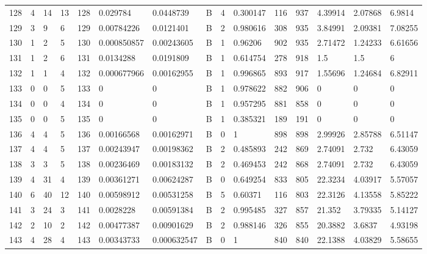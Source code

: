 \begin{latin}
\begin{longtable}{lllllllllllllll}
	128 & 4  & 14  & 13 & 128 & 0.029784       & 0.0448739      & B & 4  & 0.300147 & 116  & 937  & 4.39914 & 2.07868 & 6.9814  \\
	129 & 3  & 9   & 6  & 129 & 0.00784226     & 0.0121401      & B & 2  & 0.980616 & 308  & 935  & 3.84991 & 2.09381 & 7.08255 \\
	130 & 1  & 2   & 5  & 130 & 0.000850857    & 0.00243605     & B & 1  & 0.96206  & 902  & 935  & 2.71472 & 1.24233 & 6.61656 \\
	131 & 1  & 2   & 6  & 131 & 0.0134288      & 0.0191809      & B & 1  & 0.614754 & 278  & 918  & 1.5     & 1.5     & 6       \\
	132 & 1  & 1   & 4  & 132 & 0.000677966    & 0.00162955     & B & 1  & 0.996865 & 893  & 917  & 1.55696 & 1.24684 & 6.82911 \\
	133 & 0  & 0   & 5  & 133 & 0              & 0              & B & 1  & 0.978622 & 882  & 906  & 0       & 0       & 0       \\
	134 & 0  & 0   & 4  & 134 & 0              & 0              & B & 1  & 0.957295 & 881  & 858  & 0       & 0       & 0       \\
	135 & 0  & 0   & 5  & 135 & 0              & 0              & B & 1  & 0.385321 & 189  & 191  & 0       & 0       & 0       \\
	136 & 4  & 4   & 5  & 136 & 0.00166568     & 0.00162971     & B & 0  & 1        & 898  & 898  & 2.99926 & 2.85788 & 6.51147 \\
	137 & 4  & 4   & 5  & 137 & 0.00243947     & 0.00198362     & B & 2  & 0.485893 & 242  & 869  & 2.74091 & 2.732   & 6.43059 \\
	138 & 3  & 3   & 5  & 138 & 0.00236469     & 0.00183132     & B & 2  & 0.469453 & 242  & 868  & 2.74091 & 2.732   & 6.43059 \\
	139 & 4  & 31  & 4  & 139 & 0.00361271     & 0.00624287     & B & 0  & 0.649254 & 833  & 805  & 22.3234 & 4.03917 & 5.57057 \\
	140 & 6  & 40  & 12 & 140 & 0.00598912     & 0.00531258     & B & 5  & 0.60371  & 116  & 803  & 22.3126 & 4.13558 & 5.85222 \\
	141 & 3  & 24  & 3  & 141 & 0.0028228      & 0.00591384     & B & 2  & 0.995485 & 327  & 857  & 21.352  & 3.79335 & 5.14127 \\
	142 & 2  & 10  & 2  & 142 & 0.00477387     & 0.00901629     & B & 2  & 0.988146 & 326  & 855  & 20.3882 & 3.6837  & 4.93198 \\
	143 & 4  & 28  & 4  & 143 & 0.00343733     & 0.000632547    & B & 0  & 1        & 840  & 840  & 22.1388 & 4.03829 & 5.58655 \\

\end{longtable}
\end{latin}
